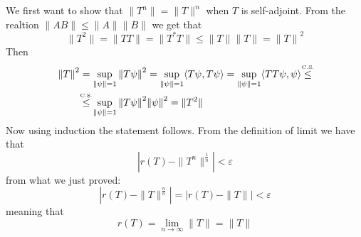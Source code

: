\documentclass{article}
\newcommand\cs{\stackrel{\mathclap{\tiny\mbox{C.S.}}}{\leq}}
\begin{document}
We first want to show that $\|T^n\| = \|T\|^n$ when $T$ is self-adjoint. From the realtion $\| A B\| \leq \|A\| \|B\|$ we get that 
\[
    \|T^2\| = \|TT\| = \|T^*T\| \leq \|T\| \|T\| = {\|T\|}^2
\]
Then 
\[
   \begin{split}
     {\|T\|}^2 &= \sup_{\|\psi\| = 1} {\|T \psi\|}^2 = \sup_{\|\psi\| = 1}\langle T \psi, T \psi \rangle = \sup_{\|\psi\| = 1}\langle TT \psi, \psi \rangle \cs\\
     &\cs \sup_{\|\psi\| = 1} {\|T\psi\|}^2 {\|\psi\|}^2 = \|T^2\|\\ 
   \end{split}
\]
Now using induction the statement follows. From the definition of limit we have that 
\[
    |r(T) - \|T^n\|^{\frac{1}{n}}|<\varepsilon
\]
from what we just proved:
\[
    |r(T) - \|T\|^{\frac{n}{n}}| = |r(T) - \|T\||<\varepsilon
\]
meaning that 
\[
    r(T) = \lim_{n\to \infty} \|T\| = \|T\|
\]
\end{document}
